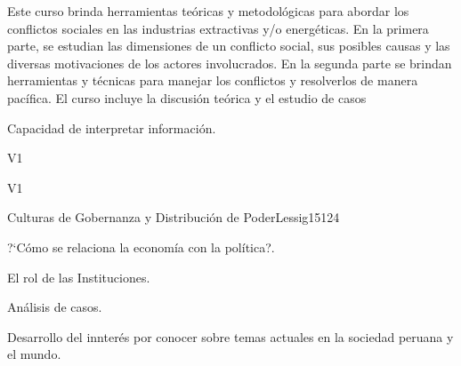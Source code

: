 \begin{syllabus}


\begin{justification}
Este curso brinda herramientas teóricas y metodológicas para abordar los conflictos sociales en las industrias extractivas y/o energéticas. En la primera parte, se estudian las dimensiones de un conflicto social, sus posibles causas y las diversas motivaciones de los actores involucrados. En la segunda parte se brindan herramientas y técnicas para manejar los conflictos y resolverlos de manera pacífica. El curso incluye la discusión teórica y el estudio de casos
\end{justification}

\begin{goals}
\item Capacidad de interpretar información.
\end{goals}

\begin{outcomes}{V1}
    \item {}
    \item {}
    \item {}
    
\end{outcomes}

\begin{competences}{V1}
    \item {}
    \item {}
    \item {}
    \item {}
\end{competences}

\begin{unit}{Culturas de Gobernanza y Distribución de Poder}{}{Lessig15}{12}{4}
   \begin{topics}
      \item ?`Cómo se relaciona la economía con la política?.
      \item El rol de las Instituciones.
      \item Análisis de casos.
   \end{topics}
   \begin{learningoutcomes}
      \item Desarrollo del innterés por conocer sobre temas actuales en la sociedad peruana y el mundo.
   \end{learningoutcomes}
\end{unit}

\begin{coursebibliography}
\end{coursebibliography}

\end{syllabus}
